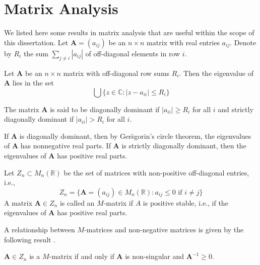 \section{Matrix Analysis}
We listed here some results in matrix analysis that are useful within
the scope of this dissertation.
%
Let $\mathbf{A} = (a_{ij})$ be an $n \times n$ matrix with real
entries $a_{ij}$. Denote by $R_i$ the sum $\sum_{j \not = i}{|a_{ij}|}$ of
off-diagonal elements in row $i$. 
%
\begin{theorem}
  \label{thm:1}
  Let $\mathbf{A}$ be an $n \times n$ matrix with off-diagonal row
  sums $R_i$. Then the eigenvalue of $\mathbf{A}$ lies in the set
  \begin{equation}
    \label{eq:23}
    \bigcup \{z \in \mathbb{C} \colon |z - a_{ii}| \leq R_i \}
  \end{equation}
\end{theorem}
\begin{definition}
  \label{def:4}
  The matrix $\mathbf{A}$ is said to be diagonally dominant if
  $|a_{ii}| \geq R_i$ for all $i$ and strictly diagonally dominant if
  $|a_{ii}| > R_i$ for all $i$.
\end{definition}
If $\mathbf{A}$ is diagonally dominant, then by Ger\u{s}gorin's
circle theorem, the eigenvalues of $\mathbf{A}$ has nonnegative real
parts. If $\mathbf{A}$ is strictly diagonally dominant, then the
eigenvalues of $\mathbf{A}$ has positive real parts. 
%
\begin{definition}
  \label{def:8}
  Let $Z_n \subset M_{n}(\mathbb{R})$ be the set of matrices with
  non-positive off-diagonal entries, i.e.,
  \begin{equation}
    \label{eq:24}
    Z_n = \{ \mathbf{A} = (a_{ij}) \in M_{n}(\mathbb{R}) \colon a_{ij}
    \leq 0 \,\, \text{if $i \not = j$} \}
  \end{equation}
 A matrix $\mathbf{A} \in Z_n$ is called an $M$-matrix if $A$ is
 positive stable, i.e., if the eigenvalues of $\mathbf{A}$ has
 positive real parts.
\end{definition}
A relationship between $M$-matrices and non-negative matrices is given
by the following result \citep[see][\S 2.5]{horn94:_topic_in_matrix_analy}.
\begin{theorem}
  \label{thm:2}
  $\mathbf{A} \in Z_n$ is a $M$-matrix if and only if $\mathbf{A}$ is
  non-singular and $\mathbf{A}^{-1} \geq 0$.  
\end{theorem}
